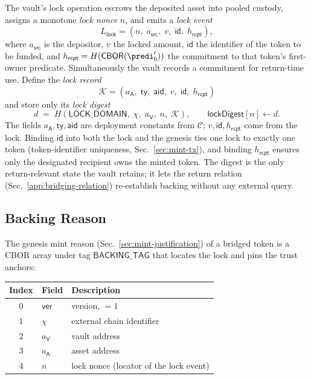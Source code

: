 The vault's lock operation escrows the deposited asset into pooled custody, assigns a monotone \emph{lock nonce} $n$, and emits a \emph{lock event}
\[
L_\mathsf{lock} = (n,\; a_\mathsf{src},\; v,\; \mathsf{id},\; h_\mathsf{rcpt}),
\]
where $a_\mathsf{src}$ is the depositor, $v$ the locked amount, $\mathsf{id}$ the identifier of the token to be funded, and $h_\mathsf{rcpt} = H(\mathsf{CBOR}(\predi'_0))$ the commitment to that token's first-owner predicate. Simultaneously the vault records a commitment for return-time use. Define the \emph{lock record}
\[
\mathcal{K} = (a_\mathsf{A},\; \mathsf{ty},\; \mathsf{aid},\; v,\; \mathsf{id},\; h_\mathsf{rcpt})
\]
and store only its \emph{lock digest}
\[
d \;=\; H(\mathsf{LOCK\_DOMAIN},\; \chi,\; a_\mathsf{V},\; n,\; \mathcal{K}),
\qquad \mathsf{lockDigest}[n] \gets d .
\]
The fields $a_\mathsf{A},\mathsf{ty},\mathsf{aid}$ are deployment constants from $\mathcal{C}$; $v,\mathsf{id},h_\mathsf{rcpt}$ come from the lock. Binding $\mathsf{id}$ into both the lock and the genesis ties one lock to exactly one token (token-identifier uniqueness, Sec.~\ref{sec:mint-tx}), and binding $h_\mathsf{rcpt}$ ensures only the designated recipient owns the minted token. The digest is the only return-relevant state the vault retains; it lets the return relation (Sec.~\ref{app:bridging-relation}) re-establish backing without any external query.

\subsection{Backing Reason}\label{app:bridging-backing-reason}

The genesis mint reason (Sec.~\ref{sec:mint-justification}) of a bridged token is a CBOR array under tag $\mathsf{BACKING\_TAG}$ that locates the lock and pins the trust anchors:

\begin{longtable}{clp{8.4cm}}
\textbf{Index} & \textbf{Field} & \textbf{Description} \\
\hline
\endhead
0 & $\mathsf{ver}$ & version, $=1$ \\
1 & $\chi$ & external chain identifier \\
2 & $a_\mathsf{V}$ & vault address \\
3 & $a_\mathsf{A}$ & asset address \\
4 & $n$ & lock nonce (locator of the lock event) \\
\end{longtable}

